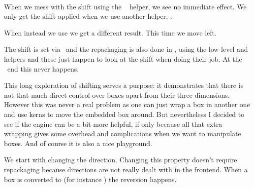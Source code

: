 \startbuffer[demo]
\setbox\scratchbox\hbox\bgroup
    \middlegray\vrule width 20mm depth  -.5mm height 10mm
    \hskip-20mm
    \darkgray  \vrule width 20mm height -.5mm depth   5mm
\egroup
\stopbuffer

\typebuffer[demo][option=TEX]

When we mess with the shift using the \CONTEXT\ \type {\shiftbox} helper, we see
no immediate effect. We only get the shift applied when we use another helper,
\type {\hpackbox}.

\startbuffer
\hbox\bgroup
    \showstruts \strut
    \quad                            \copy\scratchbox
    \quad \shiftbox\scratchbox -20mm \copy\scratchbox
    \quad \hpackbox\scratchbox       \box \scratchbox
    \quad \strut
\egroup
\stopbuffer

\typebuffer[option=TEX]

\startlinecorrection
\getbuffer[demo]\getbuffer
\stoplinecorrection

When instead we use \type {\vpackbox} we get a different result. This time we
move left.

\startbuffer
\hbox\bgroup
    \showstruts \strut
    \quad                            \copy\scratchbox
    \quad \shiftbox\scratchbox -10mm \copy\scratchbox
    \quad \vpackbox\scratchbox       \copy\scratchbox
    \quad \strut
\egroup
\stopbuffer

\typebuffer[option=TEX]

\startlinecorrection
\getbuffer[demo]\getbuffer
\stoplinecorrection

The shift is set via \LUA\ and the repackaging is also done in \LUA, using the
low level  and  helpers and these just happen to look
at the shift when doing their job. At the \TEX\ end this never happens.

This long exploration of shifting serves a purpose: it demonstrates that there is
not that much direct control over boxes apart from their three dimensions.
However this was never a real problem as one can just wrap a box in another one
and use kerns to move the embedded box around. But nevertheless I decided to see
if the engine can be a bit more helpful, if only because all that extra wrapping
gives some overhead and complications when we want to manipulate boxes. And of
course it is also a nice playground.

We start with changing the direction. Changing this property doesn't require
repackaging because directions are not really dealt with in the frontend. When
a box is converted to (for instance \PDF) the reversion happens.

